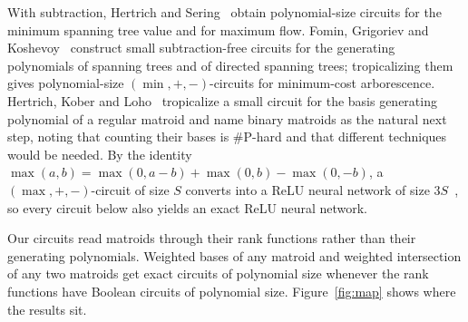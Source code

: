 \documentclass[11pt]{article}
\begin{document}
With subtraction, Hertrich and Sering~\cite{hertrich-sering25} obtain
polynomial-size circuits for
the minimum spanning tree value and for maximum flow.  Fomin, Grigoriev and
Koshevoy~\cite{fgk16} construct small subtraction-free circuits for the
generating polynomials of spanning trees and of directed spanning trees;
tropicalizing them gives polynomial-size $(\min,+,-)$-circuits for minimum-cost
arborescence.  Hertrich, Kober and
Loho~\cite{hertrich-kober-loho26} tropicalize a small circuit for the basis
generating polynomial of a regular matroid and name binary matroids as the
natural next step, noting that counting their bases is \#P-hard and that
different techniques would be needed.  By the identity
$\max(a,b)=\max(0,a-b)+\max(0,b)-\max(0,-b)$, a $(\max,+,-)$-circuit of size $S$
converts into a ReLU neural network of size $3S$~\cite{hertrich-kober-loho26},
so every circuit below also yields an exact ReLU neural network.

Our circuits read matroids through their rank functions rather than their
generating polynomials.  Weighted bases of any matroid and weighted
intersection of any two matroids get exact circuits of polynomial size whenever
the rank functions have Boolean circuits of polynomial size.
Figure~\ref{fig:map} shows where the results sit.
\end{document}
